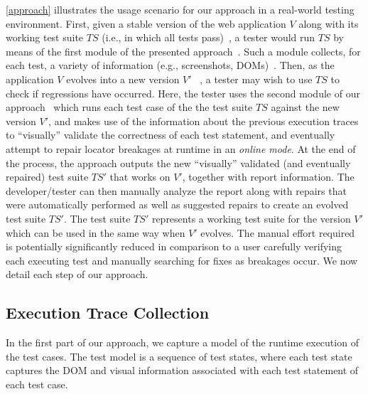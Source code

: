 \autoref{approach} illustrates the usage scenario for our approach in a real-world testing environment. 
First, given a stable version of the web application $V$ along with its working test suite $TS$ (i.e., in which all tests pass)~, a tester would run $TS$ by means of the first module of the presented approach~. Such a module collects, for each test, a variety of information (e.g., screenshots, DOMs)~. 
Then, as the application $V$ evolves into a new version $V'$ ~, a tester may wish to use $TS$ to check if regressions have occurred. Here, the tester uses the second module of our approach~ which runs each test case of the the test suite $TS$ against the new version $V'$, and makes use of the information about the previous execution traces to ``visually'' validate the correctness of each test statement, and eventually attempt to repair locator breakages at runtime in an \textit{online mode}. At the end of the process, the approach outputs the new ``visually'' validated (and eventually repaired) test suite $TS'$ that works on $V'$, together with report information. 
The developer/tester can then manually analyze the report along with repairs that were automatically performed as well as suggested repairs to create an evolved test suite $TS'$. The test suite $TS'$ represents a working test suite for the version $V'$ which can be used in the same way when $V'$ evolves. 
The manual effort required is potentially significantly reduced in comparison to a user carefully verifying each executing test and manually searching for fixes as breakages occur. %
We now detail each step of our approach. 

\subsection{Execution Trace Collection}
%
In the first part of our approach, we capture a model of the  runtime execution of the test cases. 
The test model is a sequence of test states, where each test state captures the DOM and visual information associated with each test statement of each test case. 



